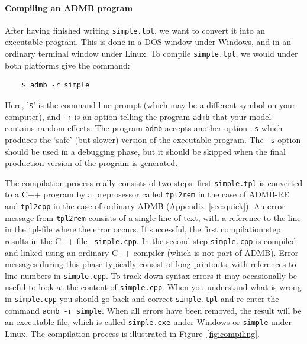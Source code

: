 \documentclass[12pt,letter,reqno]{book}
\begin{document}
\paragraph{Compiling an ADMB program}

After having finished writing \texttt{simple.tpl},
we want to convert it into an executable program. This is done in a
DOS-window under Windows, and in an ordinary terminal window under Linux. To
compile \texttt{simple.tpl}, we would under both platforms give the command:
\begin{lstlisting}
    $ admb -r simple
\end{lstlisting}
Here, '\texttt{\$}' is the command line prompt (which may be a different symbol on your computer), and
\texttt{-r} is an option telling the program \texttt{admb} that your model contains random effects. The program
\texttt{admb} accepts another option \texttt{-s} which produces the `safe' (but slower) version of the
executable program. The \texttt{-s} option should be used in a debugging phase, but it should be skipped when
the final production version of the program is generated.

The compilation process really consists of two steps: first \texttt{simple.tpl} is converted to a C++ program by
a preprosessor called \texttt{tpl2rem} in the case of ADMB-RE and \texttt{tpl2cpp} in the case of ordinary ADMB (Appendix~\ref{sec:quick}). 
An error message from \texttt{tpl2rem} consists of a 
single line of text, with a reference to the line in the tpl-file where the error occurs. 
If successful, the first compilation step results in
the C++ file \texttt{\ simple.cpp}. In the second step \texttt{simple.cpp} is compiled and linked using an
ordinary C++ compiler (which is not part of ADMB). Error messages during this phase typically consist of long
printouts, with references to line numbers in \texttt{simple.cpp}. To track down syntax errors it may
occasionally be useful to look at the content of \texttt{simple.cpp}. When you understand what is wrong in
\texttt{simple.cpp} you should go back and correct \texttt{simple.tpl} and re-enter the command \texttt{admb -r
simple}. When all errors have been removed, the result will be an executable file, which is called
\texttt{simple.exe} under Windows or \texttt{simple} under Linux. The compilation process is
illustrated in Figure~\ref{fig:compiling}.
\end{document}
